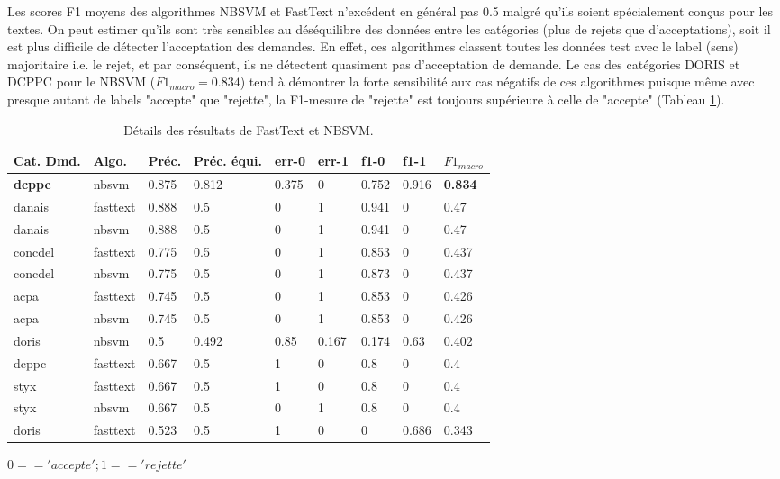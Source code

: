  Les scores F1 moyens des algorithmes  NBSVM et FastText n'excédent en général pas 0.5 malgré qu'ils soient spécialement conçus pour les textes. On peut estimer qu'ils sont très sensibles au déséquilibre des données entre les catégories (plus de rejets que d'acceptations), soit il est plus difficile de détecter l'acceptation des demandes. En effet, ces algorithmes classent toutes les données test avec le label (sens) majoritaire i.e. le rejet, et par conséquent, ils ne détectent quasiment pas d'acceptation de demande. Le cas des catégories DORIS et DCPPC pour le NBSVM ($F1_{macro} = 0.834$) tend à démontrer la forte sensibilité aux cas négatifs de ces algorithmes puisque même avec presque autant de labels "accepte" que "rejette", la F1-mesure de "rejette" est toujours supérieure à celle de "accepte" (Tableau \ref{tab:sensrst:fasttextnbsvm}). 
 
 \begin{table}[htb]
 	\scriptsize \centering
 	\begin{tabular}{|l|l|l|l|l|l|l|l|l|}
 		\hline
 	\textbf{Cat. Dmd.} & \textbf{Algo.} & \textbf{Préc.}   & \textbf{Préc. équi.} & \textbf{err-0} & \textbf{err-1} & \textbf{f1-0}  & \textbf{f1-1}  & \textbf{$F1_{macro}$} \\ \hline
 	\textbf{dcppc}       & nbsvm      & 0.875 & 0.812        & 0.375 & 0     & 0.752 & 0.916 & \textbf{0.834}        \\ \hline
 	danais      & fasttext   & 0.888 & 0.5          & 0     & 1     & 0.941    & 0 & 0.47         \\ \hline
 	danais      & nbsvm      & 0.888 & 0.5          & 0     & 1     & 0.941 & 0     & 0.47         \\ \hline
 	concdel     & fasttext   & 0.775 & 0.5          & 0     & 1     & 0.853     & 0 & 0.437        \\ \hline
 	concdel     & nbsvm      & 0.775 & 0.5          & 0     & 1     & 0.873 & 0     & 0.437        \\ \hline
 	acpa        & fasttext   & 0.745 & 0.5          & 0     & 1     & 0.853     & 0 & 0.426        \\ \hline
 	acpa        & nbsvm      & 0.745 & 0.5          & 0     & 1     & 0.853 & 0     & 0.426        \\ \hline
 	doris       & nbsvm      & 0.5   & 0.492        & 0.85  & 0.167 & 0.174 & 0.63  & 0.402        \\ \hline
 	dcppc       & fasttext   & 0.667 & 0.5          & 1     & 0     & 0.8   & 0     & 0.4          \\ \hline
 	styx        & fasttext   & 0.667 & 0.5          & 1     & 0     & 0.8     & 0   & 0.4          \\ \hline
 	styx        & nbsvm      & 0.667 & 0.5          & 0     & 1     & 0.8   & 0     & 0.4          \\ \hline
 	doris & fasttext & 0.523 & 0.5 & 1 & 0 & 0 & 0.686 & 0.343 \\ \hline
 	\end{tabular}
 	
 $0 == 'accepte'; 1 == 'rejette'$

\caption{Détails des résultats de FastText et NBSVM.}\label{tab:sensrst:fasttextnbsvm}
 \end{table}

